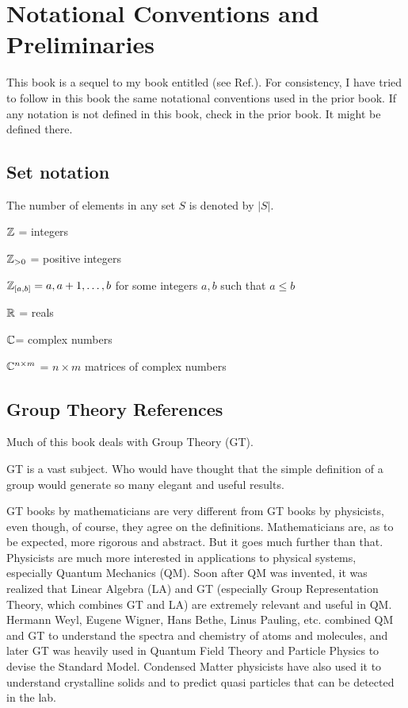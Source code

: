 \chapter{Notational Conventions and Preliminaries}
\label{ch-conventions}
This book is a sequel to
my book entitled 
(see Ref.\cite{bayesuvius}). 
For consistency, 
I have tried to follow in this book the 
same notational conventions
used in the prior book.
If any notation is not defined in this book,
check in the prior book. It might be
defined there.  

\section{Set notation}

The number of elements in any set $S$ is denoted by $|S|$.

${\mathbb{Z}}$ = integers

${\mathbb{Z}}_{>0}$ = positive integers

${\mathbb{Z}}_{[a,b]} = a, a+1, \ldots, b$
for some integers $a, b$ such that $a\leq b$

${ \mathbb{R}}$ = reals

${ \mathbb{C}}$= complex numbers

${ \mathbb{C}}^{n\times m}$ = $n\times m$ matrices of complex numbers

\section{Group Theory References}
Much of this book
deals with Group Theory (GT).


GT is a vast subject. Who would have thought
that the simple definition of 
a group would generate so many elegant and useful results.

GT books by mathematicians are very
different from GT
books by physicists,
even though, of course,
they agree on the definitions. 
Mathematicians
are, as to be expected, more rigorous and abstract. But it goes much further than that. Physicists are much
more interested in applications
to physical systems,
especially Quantum Mechanics (QM).
Soon after QM was invented,
it was realized that Linear Algebra (LA) and GT  (especially Group Representation Theory,
which combines GT and LA)
are extremely
relevant and useful in QM.
Hermann Weyl,
Eugene Wigner, Hans Bethe, Linus Pauling, etc.
combined QM and GT to understand the spectra and chemistry of atoms and molecules,
and later GT was heavily used in Quantum Field Theory and Particle Physics to devise 
the Standard Model. Condensed Matter physicists have also used it to understand crystalline solids and to predict quasi particles that can be detected in the lab. 

